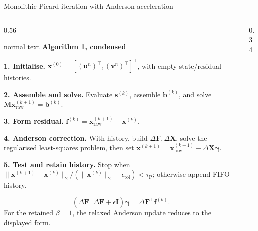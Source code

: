 \documentclass[aspectratio=169,10pt]{beamer}
\begin{document}
\begin{frame}[t]{Monolithic Picard iteration with Anderson acceleration}
  \hypertarget{supp:numerics-picard}{}
  \vspace{-0.18cm}\hfill
  \hspace{0.10cm}\GVBackupIndexButton
  \vspace{0.05cm}
  \begin{columns}[T,totalwidth=0.94\textwidth]
    \begin{column}{0.56\textwidth}
      \begin{beamercolorbox}[wd=\linewidth,sep=0.54em]{normal text}
        \small\textbf{\color{GVTeal}Algorithm 1, condensed}\par
        \vspace{0.08cm}
        \scriptsize
        \textbf{1. Initialise.} \(\mathbf{x}^{(0)}=[(\mathbf u^n)^\top,(\mathbf v^n)^\top]^\top\), with empty state/residual histories.\par
        \textbf{2. Assemble and solve.} Evaluate \(\mathbf s^{(k)}\), assemble \(\mathbf b^{(k)}\), and solve \(\mathbf M\mathbf x_{\mathrm{raw}}^{(k+1)}=\mathbf b^{(k)}\).\par
        \textbf{3. Form residual.} \(\mathbf f^{(k)}=\mathbf x_{\mathrm{raw}}^{(k+1)}-\mathbf x^{(k)}\).\par
        \textbf{4. Anderson correction.} With history, build \(\Delta\mathbf F,\Delta\mathbf X\), solve the regularised least-squares problem, then set \(\mathbf x^{(k+1)}=\mathbf x_{\mathrm{raw}}^{(k+1)}-\Delta\mathbf X\boldsymbol\gamma\).\par
        \textbf{5. Test and retain history.} Stop when \(\|\mathbf x^{(k+1)}-\mathbf x^{(k)}\|_2/(\|\mathbf x^{(k)}\|_2+\epsilon_{\mathrm{tol}})<\tau_{\mathrm P}\); otherwise append FIFO history.
      \end{beamercolorbox}
      \vspace{0.12cm}
      \scriptsize
      \[
        (\Delta\mathbf F^\top\Delta\mathbf F+\epsilon\mathbf I)\boldsymbol\gamma
        =\Delta\mathbf F^\top\mathbf f^{(k)}.
      \]
      \vspace{-0.12cm}
      \scriptsize\color{GVSlate}For the retained \(\beta=1\), the relaxed Anderson update reduces to the displayed form.
    \end{column}
    \begin{column}{0.34\textwidth}

\end{column}
\end{columns}
\end{frame}
\end{document}
